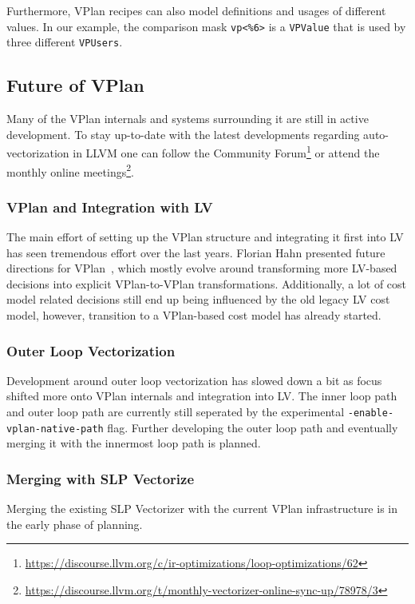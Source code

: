 \documentclass[sigplan,11pt,nonacm]{acmart}
\begin{document}
Furthermore, VPlan recipes can also model definitions and usages of different values. In our example,
the comparison mask \texttt{vp<\%6>} is a \texttt{VPValue} that is used by three different 
\texttt{VPUsers}.

\subsection{Future of VPlan}
Many of the VPlan internals and systems surrounding it are still in active development. To stay
up-to-date with the latest developments regarding auto-vectorization in LLVM one can follow the 
Community Forum\footnote{\url{https://discourse.llvm.org/c/ir-optimizations/loop-optimizations/62}} or
attend the monthly online 
meetings\footnote{\url{https://discourse.llvm.org/t/monthly-vectorizer-online-sync-up/78978/3}}.

\subsubsection{VPlan and Integration with LV}
The main effort of setting up the VPlan structure and integrating it first into LV has seen
tremendous effort over the last years. Florian Hahn presented future directions for 
VPlan~\cite{llvmvplanupdate}, which mostly evolve around transforming more LV-based decisions into
explicit VPlan-to-VPlan transformations. Additionally, a lot of cost model related decisions 
still end up being influenced by the old legacy LV cost model, however, transition to a VPlan-based 
cost model has already started.

\subsubsection{Outer Loop Vectorization}
Development around outer loop vectorization has slowed down a bit as focus shifted more onto VPlan
internals and integration into LV. The inner loop path and outer loop path are currently still
seperated by the experimental \texttt{-enable-\allowbreak vplan-\allowbreak native-\allowbreak path} 
flag. Further developing the 
outer loop path and eventually merging it with the innermost loop path is planned.

\subsubsection{Merging with SLP Vectorize}
Merging the existing SLP Vectorizer with the current VPlan infrastructure is in the early phase
of planning.
\end{document}
